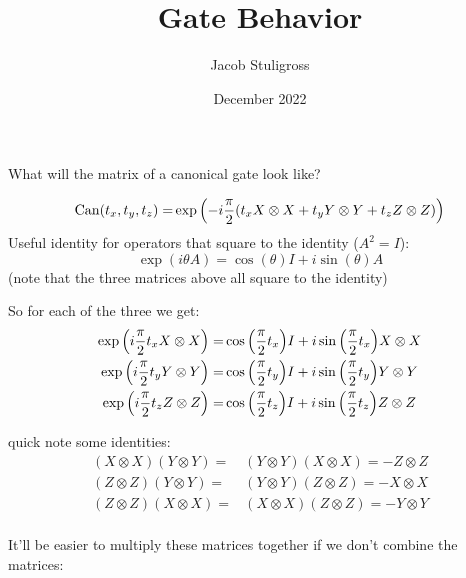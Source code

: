 \documentclass{article}
\title{Gate Behavior}
\author{Jacob Stuligross}
\date{December 2022}
\DeclareMathOperator{\can}{Can}
\begin{document}
\maketitle

What will the matrix of a canonical gate look like?

\begin{align*}
  \can(t_x,t_y,t_z) =& \exp\pqty{-i\frac{\pi}{2}\pqty{t_x X\otimes X + t_y Y\otimes Y + t_z Z\otimes Z}} \\
\end{align*}
Useful identity for operators that square to the identity ($A^2 = I$):
$$
\exp(i\theta A) = \cos(\theta) I + i\sin(\theta) A
$$
(note that the three matrices above all square to the identity)

So for each of the three we get:
\begin{align*}
  \exp\pqty{i\frac{\pi}{2}t_x X\otimes X} =& \cos\pqty{\frac{\pi}{2}t_x} I + i\sin\pqty{\frac{\pi}{2}t_x} X\otimes X \\
  \exp\pqty{i\frac{\pi}{2}t_y Y\otimes Y} =& \cos\pqty{\frac{\pi}{2}t_y} I + i\sin\pqty{\frac{\pi}{2}t_y} Y\otimes Y \\
  \exp\pqty{i\frac{\pi}{2}t_z Z\otimes Z} =& \cos\pqty{\frac{\pi}{2}t_z} I + i\sin\pqty{\frac{\pi}{2}t_z} Z\otimes Z \\
\end{align*}

quick note some identities:
\begin{align*}
  (X\otimes X)(Y\otimes Y) =& (Y\otimes Y)(X\otimes X) = -Z\otimes Z \\
  (Z\otimes Z)(Y\otimes Y) =& (Y\otimes Y)(Z\otimes Z) = -X\otimes X \\
  (Z\otimes Z)(X\otimes X) =& (X\otimes X)(Z\otimes Z) = -Y\otimes Y \\
\end{align*}

It'll be easier to multiply these matrices together if we don't combine the matrices:
\end{document}
